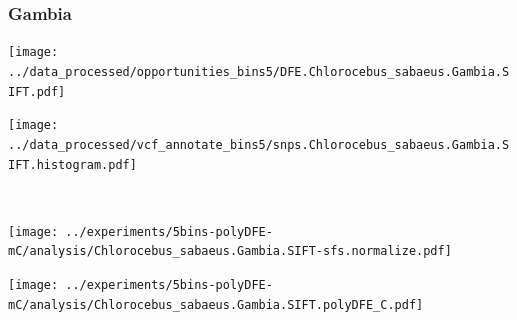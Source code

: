 \subsubsection{Gambia}

\begin{minipage}{0.49\linewidth}
    \texttt{[image: ../data\_processed/opportunities\_bins5/DFE.Chlorocebus\_sabaeus.Gambia.SIFT.pdf]}
\end{minipage}
\begin{minipage}{0.49\linewidth}
    \texttt{[image: ../data\_processed/vcf\_annotate\_bins5/snps.Chlorocebus\_sabaeus.Gambia.SIFT.histogram.pdf]}
\end{minipage}
\\
\begin{minipage}{0.49\linewidth}
    \texttt{[image: ../experiments/5bins-polyDFE-mC/analysis/Chlorocebus\_sabaeus.Gambia.SIFT-sfs.normalize.pdf]}
\end{minipage}
\begin{minipage}{0.4\linewidth}
    \texttt{[image: ../experiments/5bins-polyDFE-mC/analysis/Chlorocebus\_sabaeus.Gambia.SIFT.polyDFE\_C.pdf]}
\end{minipage}
